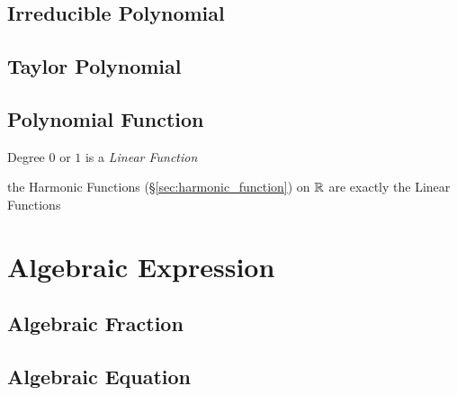 \subsection{Irreducible Polynomial}\label{sec:irreducible_polynomial}

\subsection{Taylor Polynomial}\label{sec:taylor_polynomial}

\subsection{Polynomial Function}\label{sec:polynomial_function}

Degree $0$ or $1$ is a \emph{Linear Function}

the Harmonic Functions (\S\ref{sec:harmonic_function}) on $\mathbb{R}$ are
exactly the Linear Functions



\section{Algebraic Expression}\label{sec:algebraic_expression}

\subsection{Algebraic Fraction}\label{sec:algebraic_fraction}

\subsection{Algebraic Equation}\label{sec:algebraic_equation}

